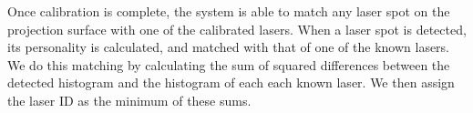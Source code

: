 \documentclass[runningheads,a4paper]{llncs}
\begin{document}


% 


% 
Once calibration is complete, the system is able to match any laser
spot on the projection surface with one of the calibrated lasers.
When a laser spot is detected, its personality is calculated, and
matched with that of one of the known lasers.
% 
We do this matching by calculating the sum of squared differences
between the detected histogram and the histogram of each each known
laser.  We then assign the laser ID as the minimum of these sums.
\end{document}
